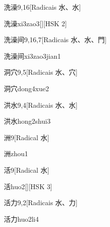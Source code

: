 \begin{entry}{洗澡}{9,16}[Radicais ⽔、⽔]
  \begin{phonetics}{洗澡}{xi3zao3}[][HSK 2]
  \end{phonetics}
\end{entry}

\begin{entry}{洗澡间}{9,16,7}[Radicais ⽔、⽔、⾨]
  \begin{phonetics}{洗澡间}{xi3zao3jian1}
  \end{phonetics}
\end{entry}

\begin{entry}{洞穴}{9,5}[Radicais ⽔、⽳]
  \begin{phonetics}{洞穴}{dong4xue2}
  \end{phonetics}
\end{entry}

\begin{entry}{洪水}{9,4}[Radicais ⽔、⽔]
  \begin{phonetics}{洪水}{hong2shui3}
  \end{phonetics}
\end{entry}

\begin{entry}{洲}{9}[Radical ⽔]
  \begin{phonetics}{洲}{zhou1}
  \end{phonetics}
\end{entry}

\begin{entry}{活}{9}[Radical ⽔]
  \begin{phonetics}{活}{huo2}[][HSK 3]
  \end{phonetics}
\end{entry}

\begin{entry}{活力}{9,2}[Radicais ⽔、⼒]
  \begin{phonetics}{活力}{huo2li4}
  \end{phonetics}
\end{entry}

